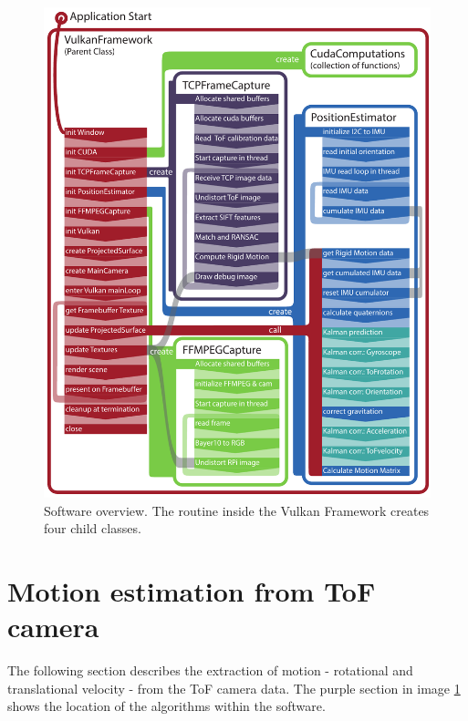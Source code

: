 \begin{figure}[H]
    \centering
    \includegraphics[width=1.0\textwidth]{images/SoftwareArchitecture.pdf}
    \caption{Software overview. The routine inside the Vulkan Framework creates four child classes.}
    \label{fig:sw_concept}
\end{figure}

\section{Motion estimation from ToF camera}
The following section describes the extraction of motion - rotational and translational velocity - from the ToF camera data. The purple section in image \ref{fig:sw_concept} shows the location of the algorithms within the software.
